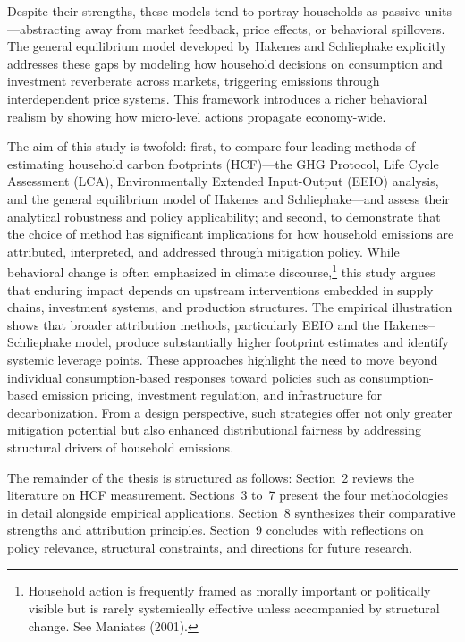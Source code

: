 \documentclass[12pt,a4paper]{article}%
\begin{document}
Despite their strengths, these models tend to portray households as passive units—abstracting away from market feedback, price effects, or behavioral spillovers. The general equilibrium model developed by Hakenes and Schliephake explicitly addresses these gaps by modeling how household decisions on consumption and investment reverberate across markets, triggering emissions through interdependent price systems. This framework introduces a richer behavioral realism by showing how micro-level actions propagate economy-wide.

The aim of this study is twofold: first, to compare four leading methods of estimating household carbon footprints (HCF)—the GHG Protocol, Life Cycle Assessment (LCA), Environmentally Extended Input-Output (EEIO) analysis, and the general equilibrium model of Hakenes and Schliephake—and assess their analytical robustness and policy applicability; and second, to demonstrate that the choice of method has significant implications for how household emissions are attributed, interpreted, and addressed through mitigation policy. While behavioral change is often emphasized in climate discourse,\footnote{Household action is frequently framed as morally important or politically visible but is rarely systemically effective unless accompanied by structural change. See Maniates (2001).} this study argues that enduring impact depends on upstream interventions embedded in supply chains, investment systems, and production structures. The empirical illustration shows that broader attribution methods, particularly EEIO and the Hakenes–Schliephake model, produce substantially higher footprint estimates and identify systemic leverage points. These approaches highlight the need to move beyond individual consumption-based responses toward policies such as consumption-based emission pricing, investment regulation, and infrastructure for decarbonization. From a design perspective, such strategies offer not only greater mitigation potential but also enhanced distributional fairness by addressing structural drivers of household emissions.

The remainder of the thesis is structured as follows: Section~2 reviews the literature on HCF measurement. Sections~3 to~7 present the four methodologies in detail alongside empirical applications. Section~8 synthesizes their comparative strengths and attribution principles. Section~9 concludes with reflections on policy relevance, structural constraints, and directions for future research.
\end{document}
